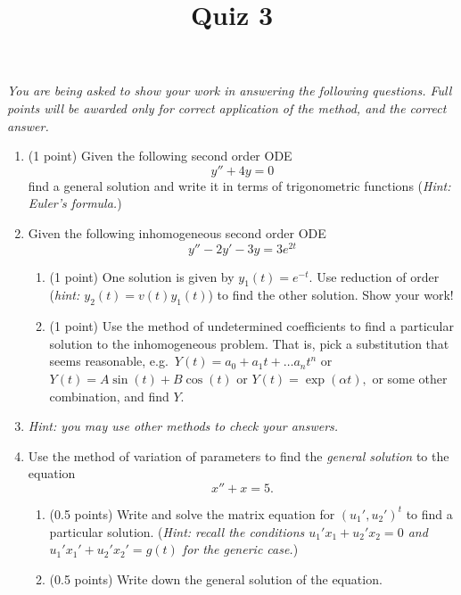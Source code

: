 \documentclass[10pt,a4paper]{article}
\title{Quiz 3}
\date{}
\begin{document}
\maketitle
\thispagestyle{fancy}
\noindent \emph{You are being asked to show your work in answering the following questions. Full points will be awarded only for correct application of the method, and the correct answer.}

\begin{enumerate}
\item (1 point) Given the following second order ODE
\[ y'' + 4 y = 0 \]
find a general solution and write it in terms of trigonometric functions (\emph{Hint: Euler's formula.})
\item Given the following inhomogeneous second order ODE
\[ y'' - 2y' - 3y = 3e^{2t} \]
\begin{enumerate}
\item (1 point) One solution is given by $y_1(t) = e^{-t}.$ Use reduction of order (\emph{hint: $y_2(t) = v(t) y_1(t)$}) to find the other solution. Show your work!
\item (1 point) Use the method of undetermined coefficients to find a particular solution to the inhomogeneous problem. That is, pick a substitution that seems reasonable, e.g.\ $Y(t) = a_0 + a_1t + \ldots a_n t^n$ or $Y(t) = A \sin(t) + B \cos(t)$ or $Y(t) = \exp(\alpha t),$ or some other combination, and find $Y.$ 
\end{enumerate}
\item[] \emph{Hint: you may use other methods to check your answers.}
\item Use the method of variation of parameters to find the \emph{general solution} to the equation 
\[ x'' + x = 5. \]
\begin{enumerate}
\item (0.5 points) Write and solve the matrix equation for $(u_1',u_2')^t$ to find a particular solution. (\emph{Hint: recall the conditions $u_1' x_1 + u_2' x_2 = 0$ and $u_1'x_1' + u_2'x_2' = g(t)$ for the generic case.})
\item (0.5 points) Write down the general solution of the equation.
\end{enumerate}
\end{enumerate}
\end{document}
